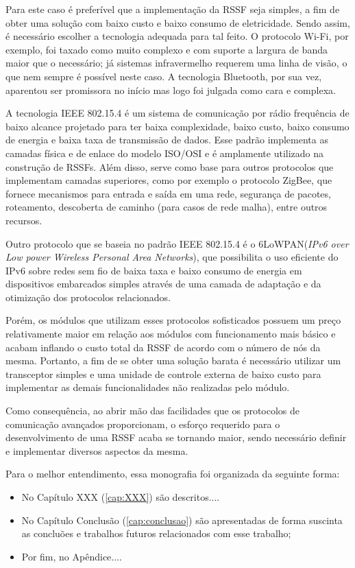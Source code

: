 Para este caso é preferível que a implementação da RSSF seja simples, a fim de obter uma solução com baixo
custo e baixo consumo de eletricidade. Sendo assim, é necessário escolher a tecnologia adequada para tal
feito. O protocolo Wi-Fi, por exemplo, foi taxado como muito complexo e com suporte a largura de banda maior
que o necessário; já sistemas infravermelho requerem uma linha de visão, o que nem sempre é possível neste
caso. A tecnologia Bluetooth, por sua vez, aparentou ser promissora no início mas logo foi julgada como cara e
complexa. \cite{sohraby_minoli_znati2007}

A tecnologia IEEE 802.15.4 é um sistema de comunicação por rádio frequência de baixo alcance projetado para
ter baixa complexidade, baixo custo, baixo consumo de energia e baixa taxa de transmissão de dados. Esse
padrão implementa as camadas física e de enlace do modelo ISO/OSI e é amplamente utilizado na construção de
RSSFs. Além disso, serve como base para outros protocolos que implementam camadas superiores, como por exemplo
o protocolo ZigBee, que fornece mecanismos para entrada e saída em uma rede, segurança de pacotes, roteamento,
descoberta de caminho (para casos de rede malha), entre outros recursos. \cite{buratti2011}

Outro protocolo que se baseia no padrão IEEE 802.15.4 é o 6LoWPAN(\textit{IPv6 over Low power Wireless
Personal Area Networks}), que possibilita o uso eficiente do IPv6 sobre redes sem fio de baixa taxa e baixo
consumo de energia em dispositivos embarcados simples através de uma camada de adaptação e da otimização dos
protocolos relacionados. \cite{shelby_bormann2009}

Porém, os módulos que utilizam esses protocolos sofisticados possuem um preço relativamente maior em relação
aos módulos com funcionamento mais básico e acabam inflando o custo total da RSSF de acordo com o número de
nós da mesma. Portanto, a fim de se obter uma solução barata é necessário utilizar um transceptor simples e
uma unidade de controle externa de baixo custo para implementar as demais funcionalidades não realizadas pelo
módulo.

Como consequência, ao abrir mão das facilidades que os protocolos de comunicação avançados proporcionam, o
esforço requerido para o desenvolvimento de uma RSSF acaba se tornando maior, sendo necessário definir e
implementar diversos aspectos da mesma.


Para o melhor entendimento, essa monografia foi organizada da seguinte forma:

\begin{itemize} \item No Capítulo XXX (\ref{cap:XXX}) são descritos....

\item No Capítulo Conclusão (\ref{cap:conclusao}) são apresentadas de forma suscinta as concluões e trabalhos
futuros relacionados com esse trabalho;

\item Por fim, no Apêndice....  \end{itemize}
